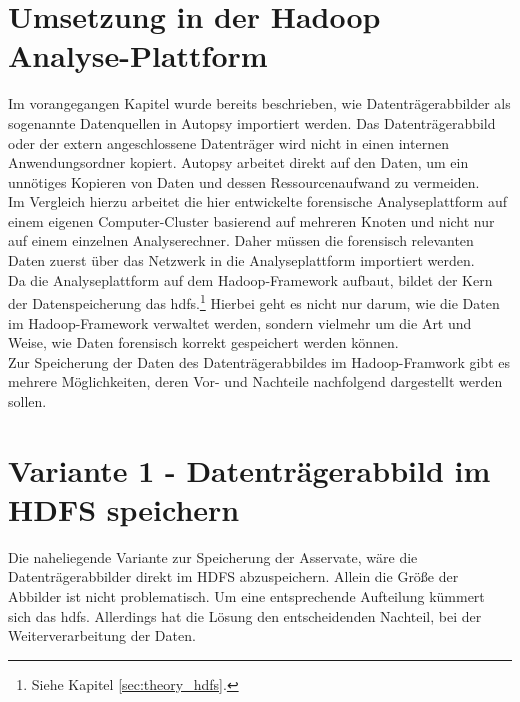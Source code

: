 \section{Umsetzung in der Hadoop Analyse-Plattform}

Im vorangegangen Kapitel wurde bereits beschrieben, wie Datenträgerabbilder als sogenannte Datenquellen in Autopsy importiert werden. Das Datenträgerabbild oder der extern angeschlossene Datenträger wird nicht in einen internen Anwendungsordner kopiert. Autopsy arbeitet direkt auf den Daten, um ein unnötiges Kopieren von Daten und dessen Ressourcenaufwand zu vermeiden. \\

\noindent
Im Vergleich hierzu arbeitet die hier entwickelte forensische Analyseplattform auf einem eigenen Computer-Cluster basierend auf mehreren Knoten und nicht nur auf einem einzelnen Analyserechner. Daher müssen die forensisch relevanten Daten zuerst über das Netzwerk in die Analyseplattform importiert werden. \\
Da die Analyseplattform auf dem Hadoop-Framework aufbaut, bildet der Kern der Datenspeicherung das \gls{hdfs}.\footnote{Siehe Kapitel \ref{sec:theory_hdfs}.} Hierbei geht es nicht nur darum, wie die Daten im Hadoop-Framework verwaltet werden, sondern vielmehr um die Art und Weise, wie Daten forensisch korrekt gespeichert werden können.\\


\noindent
Zur Speicherung der Daten des Datenträgerabbildes im Hadoop-Framwork gibt es mehrere Möglichkeiten, deren Vor- und Nachteile nachfolgend dargestellt werden sollen.

\section{Variante 1 - Datenträgerabbild im HDFS speichern}
\label{sec:variant1}

Die naheliegende Variante zur Speicherung der Asservate, wäre die Datenträgerabbilder direkt im HDFS abzuspeichern. Allein die Größe der Abbilder ist nicht problematisch. Um eine entsprechende Aufteilung kümmert sich das \gls{hdfs}. Allerdings hat die Lösung den entscheidenden Nachteil, bei der Weiterverarbeitung der Daten.\\ 

